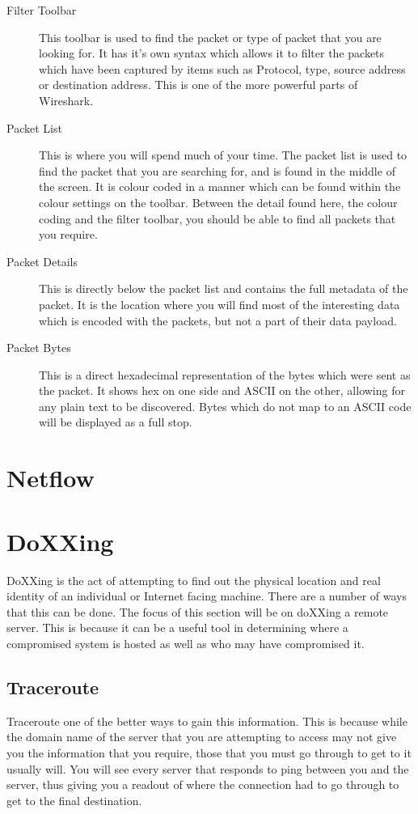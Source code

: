 \documentclass[a4paper,11pt]{report}
\begin{document}
			\begin{description}
				\item[Filter Toolbar] This toolbar is used to find the packet or type of packet that you are looking for. 
					It has it's own syntax which allows it to filter the packets which have been captured by items such as
					Protocol, type, source address or destination address. 
					This is one of the more powerful parts of Wireshark. 
				\item[Packet List] This is where you will spend much of your time. 
					The packet list is used to find the packet that you are searching for, and is found in the middle of the screen. 
					It is colour coded in a manner which can be found within the colour settings on the toolbar. 
					Between the detail found here, the colour coding and the filter toolbar, you should be able to find all packets that you require. 
				\item[Packet Details]
					This is directly below the packet list and contains the full metadata of the packet. 
					It is the location where you will find most of the interesting data which is encoded with the packets, but not a part of their data payload. 
				\item[Packet Bytes]
					This is a direct hexadecimal representation of the bytes which were sent as the packet. 
					It shows hex on one side and ASCII on the other, allowing for any plain text to be discovered. 
					Bytes which do not map to an ASCII code will be displayed as a full stop. 
			\end{description}
			
	\section{Netflow}
	\section{DoXXing}
		DoXXing is the act of attempting to find out the physical location and real identity of an individual or Internet facing machine. 
		There are a number of ways that this can be done. 
		The focus of this section will be on doXXing a remote server. 
		This is because it can be a useful tool in determining where a compromised system is hosted as well as who may have compromised it. 
		\subsection{Traceroute}
			Traceroute one of the better ways to gain this information. 
			This is because while the domain name of the server that you are attempting to access may not give you the information that you require, those that you must go through to get to it usually will. 
			You will see every server that responds to ping between you and the server, thus giving you a readout of where the connection had to go through to get to the final destination. 
\end{document}
